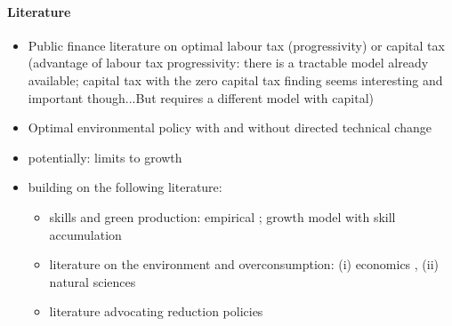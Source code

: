 \paragraph{Literature}
\begin{itemize}
\item Public finance literature on optimal labour tax (progressivity) or capital tax (advantage of labour tax progressivity: there is a tractable model already available; capital tax with the zero capital tax finding seems interesting and important though...But requires a different model with capital) \citep{Heathcote2017OptimalFramework, Conesa2009TaxingAll, Domeij2004OnTaxes}
\item Optimal environmental policy with and without directed technical change \citep{Acemoglu2012TheChange, Acemoglu2016TransitionTechnology, Fried2018ClimateAnalysis, Barrage2019OptimalPolicy, Golosov2014OptimalEquilibrium, Hassler2016EnvironmentalMacroeconomics}
\item potentially: limits to growth \citep{Stokey1998AreGrowth, Jones2016LifeGrowth, Arrow2004AreMuch}
\item building on the following literature: \begin{itemize}
\item skills and green production: empirical \citep{Consoli2016DoCapital, Bowen2018CharacterisingComposition, Borissov2019CarbonDevelopment}; growth model with skill accumulation \citep{Borissov2019CarbonDevelopment}
\item literature on the environment and overconsumption: (i) economics \citep{Dasgupta2021, Brock2005ChapterEmpirics, Arrow2004AreMuch, Cohen2019AnnualSubstitutable}, (ii) natural sciences \citep{ Rockstrom2009AHumanity, Rogelj2018MitigationDevelopment.}
\item literature advocating reduction policies \citep{Schor2005SustainableReduction, Pullinger2014WorkingDesign}

\end{itemize}
\end{itemize}
